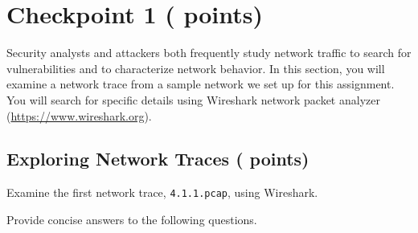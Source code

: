   \setcounter{pts-hosts}{3}
 \setcounter{pts-tcp}{1}
 \setcounter{pts-gw}{2}
 \setcounter{pts-ftp}{3}
 \setcounter{pts-portscan}{1}
\setcounter{pts-cp1.1}{
    \value{pts-hosts}+\value{pts-tcp}+\value{pts-gw}+\value{pts-ftp}+\value{pts-portscan}
}
 \setcounter{pts-year}{1}
 \setcounter{pts-domain}{1}
 \setcounter{pts-cslist}{1}
 \setcounter{pts-servercs}{1}
 \setcounter{pts-name}{2}
 \setcounter{pts-msg}{3}
 \setcounter{pts-cookie}{1}
\setcounter{pts-cp1.2}{
    \value{pts-domain}+\value{pts-cslist}+\value{pts-servercs}+\value{pts-year}+\value{pts-name}+\value{pts-msg}+\value{pts-cookie}
}
\setcounter{pts-cp1}{\value{pts-cp1.1}+\value{pts-cp1.2}}

\section{Checkpoint 1 ( points)}
\label{sec:cp1}

Security analysts and attackers both frequently study network traffic to search for vulnerabilities and to characterize network behavior.
In this section, you will examine a network trace from a sample network we set up for this assignment.
You will search for specific details using Wireshark network packet analyzer (\url{https://www.wireshark.org}).

\subsection{Exploring Network Traces ( points)}
\label{sec:cp1.1}
Examine the first network trace, \texttt{4.1.1.pcap}, using Wireshark.

\medskip

Provide concise answers to the following questions.

\newcommand{\filemac}{\ref*{sec:cp1.1}.\ref*{itm:macip}\_mac.txt}
\newcommand{\fileip}{\ref*{sec:cp1.1}.\ref*{itm:macip}\_ip.txt}
\newcommand{\filetcp}{\ref*{sec:cp1.1}.\ref*{itm:tcp}.txt}
\newcommand{\filegw}{\ref*{sec:cp1.1}.\ref*{itm:gw}.txt}
\newcommand{\fileactive}{\ref*{sec:cp1.1}.\ref*{itm:ftp}\_active.txt}
\newcommand{\filepassive}{\ref*{sec:cp1.1}.\ref*{itm:ftp}\_passive.txt}
\newcommand{\fileportscan}{\ref*{sec:cp1.1}.\ref*{itm:portscan}.txt}

